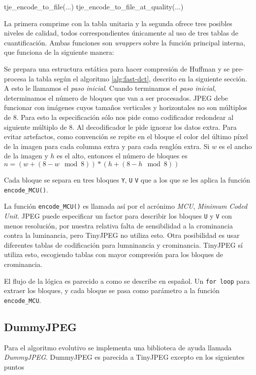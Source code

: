 \begin{code}[language=C][h]
tje_encode_to_file(...)
tje_encode_to_file_at_quality(...)
\end{code}

La primera comprime con la tabla unitaria y la segunda ofrece tres posibles
niveles de calidad, todos correspondientes únicamente al uso de tres tablas de
cuantificación. Ambas funciones son \emph{wrappers} sobre la función principal
interna, que funciona de la siguiente manera:

Se prepara una estructura estática para hacer compresión de Huffman y se
pre-procesa la tabla según el algoritmo \ref{alg:fast-dct}, descrito en la
siguiente sección. A esto le llamamos el \emph{paso inicial}.
Cuando terminamos el \emph{paso inicial}, determinamos el número de bloques que
van a ser procesados. JPEG debe funcionar con imágenes cuyos tamaños verticales
y horizontales no son múltiplos de 8. Para esto la especificación sólo nos pide
como codificador redondear al siguiente múltiplo de 8. Al decodificador le pide
ignorar los datos extra. Para evitar artefactos, como convención se repite en
el bloque el color del último píxel de la imagen para cada columna extra y para
cada renglón extra. Si $w$ es el ancho de la imagen y $h$ es el alto, entonces
el número de bloques es
$n = (w + (8 - w \mod 8)) * (h + (8 - h \mod 8))$

Cada bloque se separa en tres bloques \verb+Y+, \verb+U+ \verb+V+ que a los que se les aplica la función \verb+encode_MCU()+.

La función \verb+encode_MCU()+ es llamada así por el acrónimo \emph{MCU},
\emph{Minimum Coded Unit}. JPEG puede especificar un factor para describir los
bloques \verb+U+ y \verb+V+ con menos resolución, por nuestra relativa falta de
sensibilidad a la crominancia contra la luminancia, pero TinyJPEG no utiliza
esto. Otra posibilidad es usar diferentes tablas de codificación para
lumninancia y crominancia. TinyJPEG sí utiliza esto, escogiendo tablas con
mayor compresión para los bloques de crominancia.

El flujo de la lógica es parecido a como se describe en español. Un \verb+for loop+ para extraer los bloques, y cada bloque se pasa como parámetro a la función \verb+encode_MCU+.

\subsection{DummyJPEG} \label{sub:dummy}

Para el algoritmo evolutivo se implementa una biblioteca de ayuda llamada
\emph{DummyJPEG}. DummyJPEG es parecida a TinyJPEG excepto en los siguientes
puntos

